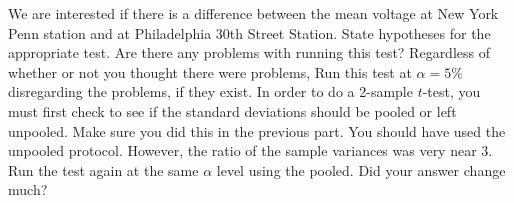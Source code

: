 \documentclass[12pt]{article}
\begin{document}
\benum
\easysubproblem We are interested if there is a difference between the mean voltage at New York Penn station and at Philadelphia 30th Street Station. State hypotheses for the appropriate test.
\intermediatesubproblem Are there any problems with running this test?
\intermediatesubproblem Regardless of whether or not you thought there were problems, Run this test at $\alpha = 5\%$ disregarding the problems, if they exist.
\intermediatesubproblem In order to do a 2-sample $t$-test, you must first check to see if the standard deviations should be pooled or left unpooled. Make sure you did this in the previous part. You should have used the unpooled protocol. However, the ratio of the sample variances was very near 3. Run the test again at the same $\alpha$ level using the pooled. Did your answer change much?
\eenum
\end{document}
